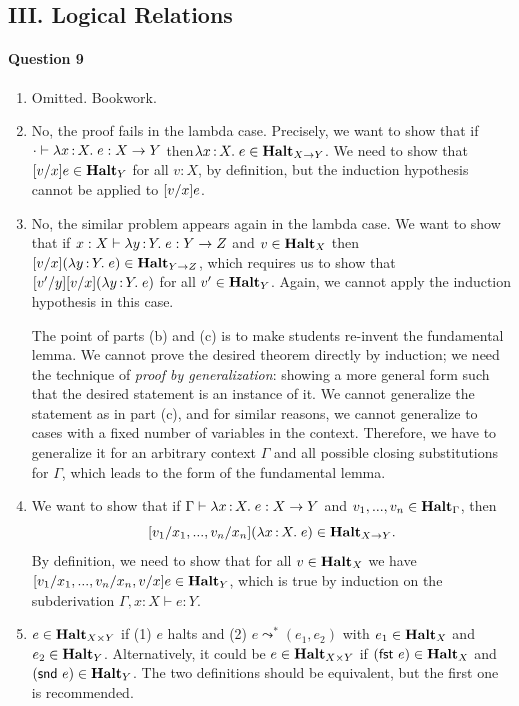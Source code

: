 \documentclass[11pt,a4paper,twoside]{article}
\begin{document}
\subsection*{III. Logical Relations}

\paragraph*{Question 9} 

\begin{enumerate}[label=(\alph*)]
  \item Omitted. Bookwork.
  \item No, the proof fails in the lambda case. Precisely, we want to show that
    if $\cdot \vdash \lambda x \,{:}\, X .\; e : X \to Y$ then$ \lambda x \,{:}\, X .\; e \in \textbf{Halt}_{X \to Y}$.
    We need to show that $[v / x] e \in \textbf{Halt}_Y$ for all $v : X$, by definition,
    but the induction hypothesis cannot be applied to $[v / x] e$.
  \item No, the similar problem appears again in the lambda case.
    We want to show that if $x : X \vdash \lambda y \,{:}\, Y .\; e : Y \to Z$ and
    $v \in \textbf{Halt}_X$ then $[v / x] (\lambda y \,{:}\, Y .\; e) \in \textbf{Halt}_{Y \to Z}$, which requires us to show
    that $[v' / y] [v / x] (\lambda y \,{:}\, Y .\; e)$ for all $v' \in \textbf{Halt}_Y$.
    Again, we cannot apply the induction hypothesis in this case.

    The point of parts (b) and (c) is to make students re-invent the fundamental lemma.
    We cannot prove the desired theorem directly by induction; we need the technique of 
    \emph{proof by generalization}: showing a more general form such that 
    the desired statement is an instance of it. 
    We cannot generalize the statement as in part (c),
    and for similar reasons, we cannot generalize to cases with a fixed
    number of variables in the context. Therefore, we have to generalize it for an
    arbitrary context $\Gamma$ and all possible closing substitutions for $\Gamma$, 
    which leads to the form of the fundamental lemma.
  \item 
    We want to show that if $\Gamma \vdash \lambda x \,{:}\, X .\; e : X \to Y$ and 
    $v_1, ..., v_n \in \textbf{Halt}_{\Gamma}$, then 
      \[[v_1 / x_1, ..., v_n / x_n] (\lambda x \,{:}\, X .\; e) \in \textbf{Halt}_{X \to Y}.\]
    By definition, we need to show that for all $v \in \textbf{Halt}_X$ we have
    $[v_1 / x_1, ..., v_n / x_n, v / x] e \in \textbf{Halt}_Y$, which is true by induction on
    the subderivation $\Gamma , x : X \vdash e : Y$.
  \item $e \in \textbf{Halt}_{X \times Y}$ if
    (1) $e$ halts and (2) $e \leadsto^* (e_1, e_2)$ with $e_1 \in \textbf{Halt}_X$ and $e_2 \in \textbf{Halt}_Y$.
    Alternatively, it could be $e \in \textbf{Halt}_{X \times Y}$
    if $(\mathsf{fst}\ e) \in \textbf{Halt}_X$ and $(\mathsf{snd}\ e) \in \textbf{Halt}_Y$.
    The two definitions should be equivalent, but the first one is recommended.


\end{enumerate}
\end{document}
